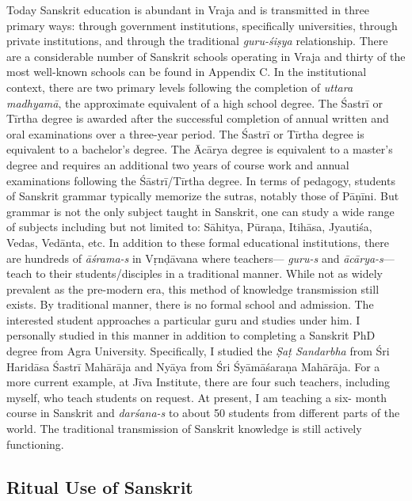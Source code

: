 Today Sanskrit education is abundant in Vraja and is transmitted in three primary ways: through government institutions, specifically universities, through private institutions, and through the traditional {\sl guru-śiṣya} relationship. There are a considerable number of Sanskrit schools operating in Vraja and thirty of the most well-known schools can be found in Appendix C\@. In the institutional context, there are two primary levels following the completion of {\sl uttara madhyamā}, the approximate equivalent of a high school degree. The Śastrī or Tīrtha degree is awarded after the successful completion of annual written and oral examinations over a three-year period. The Śastrī or Tīrtha degree is equivalent to a bachelor’s degree. The Ācārya degree is equivalent to a master’s degree and requires an additional two years of course work and annual examinations following the Śāstrī/Tīrtha degree. In terms of pedagogy, students of Sanskrit grammar typically memorize the sutras, notably those of Pāṇīni. But grammar is not the only subject taught in Sanskrit, one can study a wide range of subjects including but not limited to: Sāhitya, Pūraṇa, Itihāsa, Jyautiśa, Vedas, Vedānta, etc. In addition to these formal educational institutions, there are hundreds of {\sl āśrama-s} in Vṛnḍāvana where teachers— {\sl guru-s} and {\sl ācārya-s}— teach to their students/disciples in a traditional manner. While not as widely prevalent as the pre-modern era, this method of knowledge transmission still exists. By traditional manner, there is no formal school and admission. The interested student approaches a particular guru and studies under him. I personally studied in this manner in addition to completing a Sanskrit PhD degree from Agra University. Specifically, I studied the {\sl Ṣaṭ Sandarbha} from Śri Haridāsa Śastrī Mahārāja and Nyāya from Śri Śyāmāśaraṇa Mahārāja. For a more current example, at Jīva Institute, there are four such teachers, including myself, who teach students on request. At present, I am teaching a six- month course in Sanskrit and {\sl darśana-s} to about 50 students from different parts of the world. The traditional transmission of Sanskrit knowledge is still actively functioning. 

\subsection*{Ritual Use of Sanskrit }
\vskip -5pt

